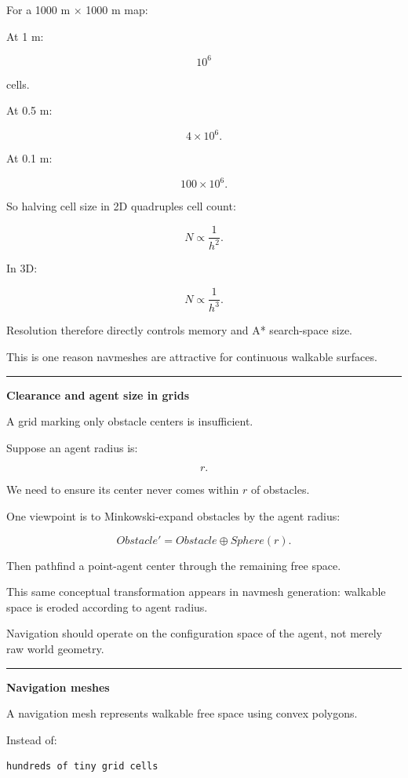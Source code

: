 For a 1000 m × 1000 m map:

At 1 m:

\[
10^6
\]

cells.

At 0.5 m:

\[
4\times10^6.
\]

At 0.1 m:

\[
100\times10^6.
\]

So halving cell size in 2D quadruples cell count:

\[
N\propto\frac1{h^2}.
\]

In 3D:

\[
N\propto\frac1{h^3}.
\]

Resolution therefore directly controls memory and A* search-space size.

This is one reason navmeshes are attractive for continuous walkable surfaces.

\begin{center}\rule{0.5\linewidth}{0.5pt}\end{center}

\textbf{Clearance and agent size in grids}

A grid marking only obstacle centers is insufficient.

Suppose an agent radius is:

\[
r.
\]

We need to ensure its center never comes within \(r\) of obstacles.

One viewpoint is to Minkowski-expand obstacles by the agent radius:

\[
Obstacle'
=
Obstacle\oplus Sphere(r).
\]

Then pathfind a point-agent center through the remaining free space.

This same conceptual transformation appears in navmesh generation: walkable space is eroded according to agent radius.

Navigation should operate on the configuration space of the agent, not merely raw world geometry.

\begin{center}\rule{0.5\linewidth}{0.5pt}\end{center}

\textbf{Navigation meshes}

A navigation mesh represents walkable free space using convex polygons.

Instead of:

\begin{verbatim}
hundreds of tiny grid cells
\end{verbatim}

